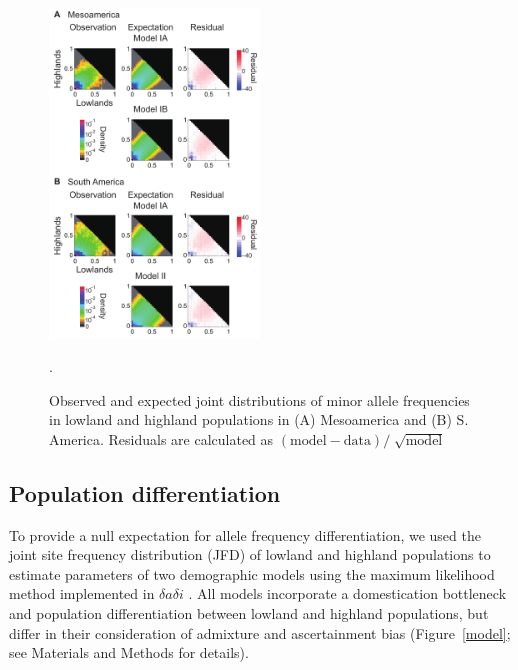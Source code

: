 \begin{figure}[tb]   
  \begin{center}
   \vspace{-0mm}
   \includegraphics[width=0.5\textwidth]{fig/Fig4}
   \renewcommand{\baselinestretch}{0.9}
   \vspace{-3mm}
   \caption{Observed and expected joint distributions of minor allele frequencies in lowland and highland populations in (A) Mesoamerica and (B) S. America. Residuals are calculated as  $(\mbox{model}-\mbox{data})/\sqrt[]{\mbox{model}}$}.
\vspace{-6mm}
    \label{JFD}
  \end{center}
\end{figure}

\subsection*{Population differentiation}

To provide a null expectation for allele frequency differentiation, we used the joint site frequency distribution (JFD) of lowland and highland populations to estimate parameters of two demographic models  using the maximum likelihood method implemented in $\delta a \delta i$ \cite[]{Gutenkunst_2009_19851460}.  
All models incorporate a domestication bottleneck \cite[]{Wright_2005_15919994} and population differentiation between lowland and highland populations, but differ in their consideration of admixture and ascertainment bias (Figure~\ref{model}; see Materials and Methods for details).

